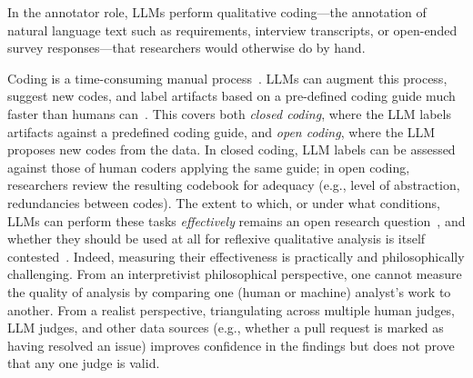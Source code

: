 \label{sec:llms-as-annotators}

In the annotator role, LLMs perform qualitative coding---the annotation of natural language text such as requirements, interview transcripts, or open-ended survey responses---that researchers would otherwise do by hand.

Coding is a time-consuming manual process~\cite{DBLP:journals/ase/BanoHZT24}. LLMs can augment this process, suggest new codes, and label artifacts based on a pre-defined coding guide much faster than humans can~\cite{DBLP:conf/chi/HeHDRH24}. This covers both \emph{closed coding}, where the LLM labels artifacts against a predefined coding guide, and \emph{open coding}, where the LLM proposes new codes from the data. In closed coding, LLM labels can be assessed against those of human coders applying the same guide; in open coding, researchers review the resulting codebook for adequacy (e.g., level of abstraction, redundancies between codes).
The extent to which, or under what conditions, LLMs can perform these tasks \textit{effectively} remains an open research question~\cite{DBLP:conf/msr/AhmedDTP25}, and whether they should be used at all for reflexive qualitative analysis is itself contested~\cite{jowsey2025reject}. Indeed, measuring their effectiveness is practically and philosophically challenging. From an interpretivist philosophical perspective, one cannot measure the quality of analysis by comparing one (human or machine) analyst's work to another. From a realist perspective, triangulating across multiple human judges, LLM judges, and other data sources (e.g., whether a pull request is marked as having resolved an issue) improves confidence in the findings but does not prove that any one judge is valid.

